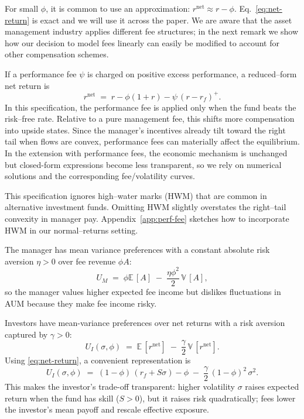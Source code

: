 \documentclass[11pt]{article}
\def\E{{\mathbb{E}}\,}
\def\V{{\mathbb{V}}\,}
\newcommand{\Sharpe}{S}
\newcommand{\rf}{r_f}
\begin{document}
For small \(\phi\), it is common to use an approximation: \(r^{\text{net}}\approx r-\phi\). Eq.~\eqref{eq:net-return} is exact and we will use it across the paper. We are aware that the asset management industry applies different fee structures; in the next remark we show how our decision to model fees linearly can easily be modified to account for other compensation schemes. 

If a performance fee \(\psi\) is charged on positive excess performance, a reduced–form net return is
\[
r^{\text{net}} \;=\; r - \phi(1+r) - \psi\,(r-\rf)^+.
\]
In this specification, the performance fee is applied only when the fund beats the risk–free rate. Relative to a pure management fee, this shifts more compensation into upside states. Since the manager’s incentives already tilt toward the right tail when flows are convex, performance fees can materially affect the equilibrium. In the extension with performance fees, the economic mechanism is unchanged but closed-form expressions become less transparent, so we rely on numerical solutions and the corresponding fee/volatility curves.

This specification ignores high–water marks (HWM) that are common in alternative investment funds. Omitting HWM slightly overstates the right–tail convexity in manager pay. Appendix~\ref{app:perf-fee} sketches how to incorporate HWM in our normal–returns setting.

The manager has mean variance preferences with a constant absolute risk aversion $\eta>0$ over fee revenue \(\phi A\):
\begin{equation}
    U_M \;=\; \phi\E[ A] \;-\; \frac{\eta \phi^2}{2}\,\V[A],
\end{equation}
so the manager values higher expected fee income but dislikes fluctuations in AUM because they make fee income risky.

Investors have mean-variance preferences over net returns with a risk aversion captured by $\gamma>0$:
\begin{equation}
\label{eq:UI}
    U_I(\sigma,\phi)\;=\;\E[r^{\text{net}}] \;-\; \frac{\gamma}{2}\,\V[r^{\text{net}}].
\end{equation}
Using \eqref{eq:net-return}, a convenient representation is
\begin{equation}
\label{eq:UI-expanded}
U_I(\sigma,\phi) \;=\; (1-\phi)\,(\rf+\Sharpe\sigma) - \phi \;-\; \frac{\gamma}{2}\,(1-\phi)^2\,\sigma^2.
\end{equation}
This makes the investor’s trade-off transparent: higher volatility $\sigma$ raises expected return when the fund has skill ($\Sharpe>0$), but it raises risk quadratically; fees lower the investor’s mean payoff and rescale effective exposure.
\end{document}
